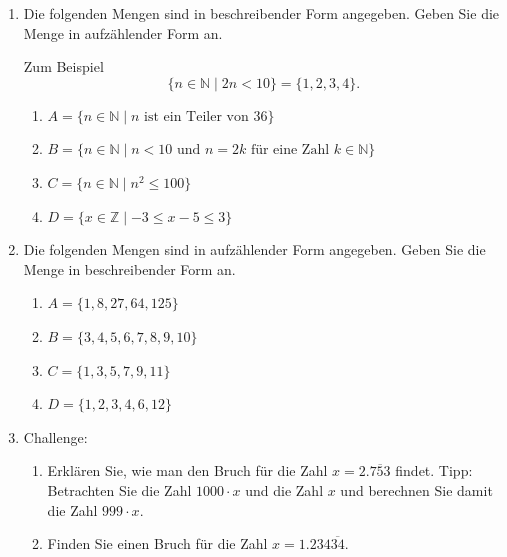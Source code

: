 \begin{ueb}
\begin{enumerate}
              \begin{enumerate}
                  \item \(\mathbb{Z}\) ohne \(\mathbb{N}\)
                  \item \(\mathbb{Z}\) ohne \(\{-1,-2,-3,\ldots\}\)
                  \item \(\mathbb{Q}^{+}\) ohne \(\{-1,-2,-3,\ldots\}\)
              \end{enumerate}
        \item Die folgenden Mengen sind in beschreibender Form angegeben. Geben Sie die Menge in aufzählender Form an.

              Zum Beispiel
              \[
                  \{n \in \mathbb{N} \mid 2n < 10\} = \{1,2,3,4\}.
              \]

              \begin{enumerate}
                  \item \(A = \{n \in \mathbb{N} \mid n \text{ ist ein Teiler von } 36\}\)
                  \item \(B = \{n \in \mathbb{N} \mid n < 10 \text{ und } n = 2k \text{ für eine Zahl } k \in \mathbb{N}\}\)
                  \item \(C = \{n \in \mathbb{N} \mid n^2 \leq 100\}\)
                  \item \(D = \{x \in \mathbb{Z} \mid -3 \leq x - 5 \leq 3\}\)
              \end{enumerate}

        \item Die folgenden Mengen sind in aufzählender Form angegeben. Geben Sie die Menge in beschreibender Form an.

              \begin{enumerate}
                  \item \(A = \{1,8,27,64,125\}\)
                  \item \(B = \{3,4,5,6,7,8,9,10\}\)
                  \item \(C = \{1,3,5,7,9,11\}\)
                  \item \(D = \{1,2,3,4,6,12\}\)
              \end{enumerate}
        \item Challenge:
              \begin{enumerate}
                  \item Erklären Sie, wie man den Bruch für die Zahl \(x = 2.\overline{753}\) findet. Tipp: Betrachten Sie die Zahl \(1000\cdot x\) und die Zahl \(x\) und berechnen Sie damit die Zahl \(999\cdot x\).
                  \item Finden Sie einen Bruch für die Zahl \(x = 1.234\overline{34}\).
              \end{enumerate}
    \end{enumerate}


\end{ueb}



